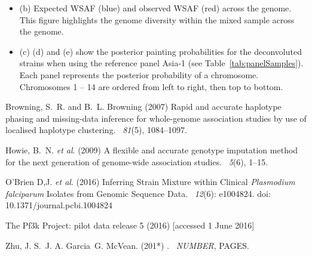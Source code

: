 \documentclass{article}
\begin{document}
\begin{itemize}
\item (b) Expected WSAF (blue) and observed WSAF (red) across the genome. This figure highlights the genome diversity within the mixed sample across the genome.

\item (c) (d) and (e) show the posterior painting probabilities for the deconvoluted strains when using the reference panel Asia-1 (see Table~\ref{tab:panelSamples}). Each panel represents the posterior probability of a chromosome. Chromosomes 1 -- 14 are ordered from left to right, then top to bottom.
\end{itemize}

\newpage

\begin{thebibliography}{}

Browning, S.~R. and B.~L. Browning (2007)
\newblock Rapid and accurate haplotype phasing and missing-data inference for
  whole-genome association studies by use of localised haplotype clustering.
~{\em 81\/}(5), 1084--1097.

Howie, B.~N. {\em et al}. (2009)
\newblock A flexible and accurate genotype imputation method for the next
  generation of genome-wide association studies.
~{\em 5\/}(6), 1--15.



O'Brien D,J. {\em et al}. (2016)
\newblock Inferring Strain Mixture within Clinical {\em Plasmodium falciparum} Isolates from Genomic Sequence Data. ~{\em 12\/}(6): e1004824. doi: 10.1371/journal.pcbi.1004824


The Pf3k Project: pilot data release 5 (2016)
 [accessed 1 June 2016]


Zhu, J. S.\, J. A. Garcia\, G. McVean. (201*)
.
~{\em NUMBER\/}, PAGES.

\end{thebibliography}
\end{document}
